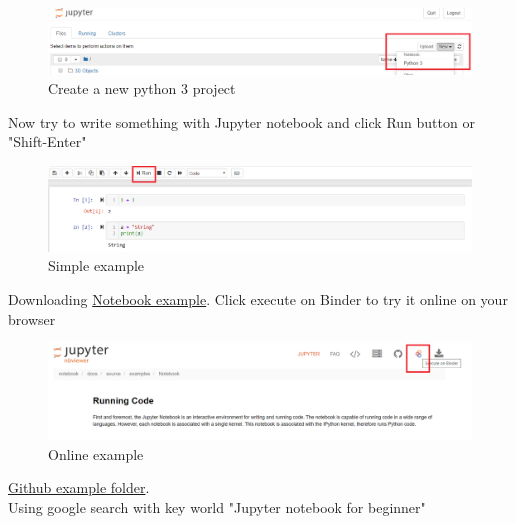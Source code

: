 \documentclass[a4paper,10pt]{article}
\begin{document}
\begin{figure}[H]
\centering\includegraphics[width=1\columnwidth]{Pictures/Jupyter_new.png}
\caption[Short title]{Create a new python 3 project}
\label{fig:ff8}\end{figure}

\vspace{1cm}

Now try to write something with Jupyter notebook and click Run button or "Shift-Enter"

\begin{figure}[H]
\centering\includegraphics[width=1\columnwidth]{Pictures/Jupyter_try.png}
\caption[Short title]{Simple example}
\label{fig:ff9}\end{figure}

\vspace{1cm}

Downloading \href{https://nbviewer.jupyter.org/github/jupyter/notebook/blob/master/docs/source/examples/Notebook/Running\%20Code.ipynb#}{Notebook example}. Click execute on Binder to try it online on your browser


\begin{figure}[H]
\centering\includegraphics[width=1\columnwidth]{Pictures/Jupyter_online_try.png}
\caption[Short title]{Online example}
\label{fig:ff10}\end{figure}

\vspace{1cm}

\href{https://github.com/jupyter/notebook/blob/master/docs/source/examples/Notebook/Running\%20Code.ipynb}{Github example folder}.\\
Using google search with key world "Jupyter notebook for beginner"
\end{document}
